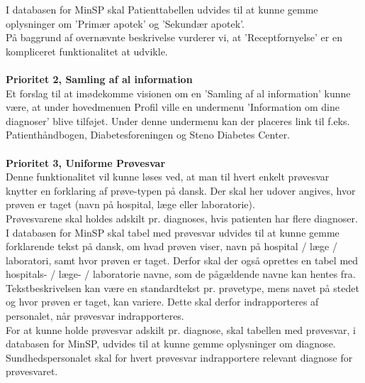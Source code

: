 I databasen for MinSP skal Patienttabellen udvides til at kunne gemme oplysninger om 'Primær apotek' og 'Sekundær apotek'.\\
På baggrund af overnævnte beskrivelse vurderer vi, at 'Receptfornyelse' er en kompliceret funktionalitet at udvikle.
\\\\
\textbf{Prioritet 2, Samling af al information} \\
Et forslag til at imødekomme visionen om en 'Samling af al information' kunne være, at under hovedmenuen Profil ville en undermenu 'Information om dine diagnoser' blive tilføjet. Under denne undermenu kan der placeres link til f.eks. Patienthåndbogen, Diabetesforeningen og Steno Diabetes Center.
\\\\ 
\textbf{Prioritet 3, Uniforme Prøvesvar} \\
Denne funktionalitet vil kunne løses ved, at man til hvert enkelt prøvesvar knytter en forklaring af prøve-typen på dansk. Der skal her udover angives, hvor prøven er taget (navn på hospital, læge eller laboratorie).\\
Prøvesvarene skal holdes adskilt pr. diagnoses, hvis patienten har flere diagnoser.\\
I databasen for MinSP skal tabel med prøvesvar udvides til at kunne gemme forklarende tekst på dansk, om hvad prøven viser, navn på hospital / læge / laboratori, samt hvor prøven er taget. Derfor skal der også oprettes en tabel med hospitals- / læge- / laboratorie navne, som de pågældende navne kan hentes fra.\\ 
Tekstbeskrivelsen kan være en standardtekst pr. prøvetype, mens navet på stedet og hvor prøven er taget, kan variere. Dette skal derfor indrapporteres af personalet, når prøvesvar indrapporteres. \\
For at kunne holde prøvesvar adskilt pr. diagnose, skal tabellen med prøvesvar, i databasen for MinSP, udvides til at kunne gemme oplysninger om diagnose. Sundhedspersonalet skal for hvert prøvesvar indrapportere relevant diagnose for prøvesvaret. 
